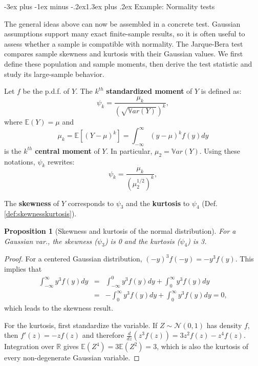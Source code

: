 \documentclass[
  11pt,
]{book}
\makeatletter
\renewcommand\section{\@startsection{section}{1}{\z@}
  {-3ex plus -1ex minus -.2ex}{1.3ex plus .2ex}
  {\normalfont\Large\bfseries\color{TextbookInk}}}
\newtheorem{proposition}{Proposition}[chapter]
\theoremstyle{definition}
\theoremstyle{definition}
\theoremstyle{definition}
\theoremstyle{definition}
\theoremstyle{remark}
\makeatother
\begin{document}
\section{Example: Normality tests}\label{example-normality-tests}

The general ideas above can now be assembled in a concrete test. Gaussian assumptions support many exact finite-sample results, so it is often useful to assess whether a sample is compatible with normality. The Jarque-Bera test compares sample skewness and kurtosis with their Gaussian values. We first define these population and sample moments, then derive the test statistic and study its large-sample behavior.

Let \(f\) be the p.d.f. of \(Y\). The \(k^{th}\) \textbf{standardized moment} of \(Y\) is defined as:
\[
\psi_k = \frac{\mu_k}{\left(\sqrt{\mathbb{V}ar(Y)}\right)^k},
\]
where \(\mathbb{E}(Y)=\mu\) and
\[
\mu_k = \mathbb{E}[(Y-\mu)^k]= \int_{-\infty}^{\infty} (y-\mu)^k f(y) dy
\]
is the \(k^{th}\) \textbf{central moment} of \(Y\). In particular, \(\mu_2 = \mathbb{V}ar(Y)\). Using these notations, \(\psi_k\) rewrites:
\[
\psi_k = \frac{\mu_k}{\left(\mu_2^{1/2}\right)^k},
\]

The \textbf{skewness} of \(Y\) corresponds to \(\psi_3\) and the \textbf{kurtosis} to \(\psi_4\) (Def. \ref{def:skewnesskurtosis}).

\begin{proposition}[Skewness and kurtosis of the normal distribution]
\protect\hypertarget{prp:normSkewKurt}{}\label{prp:normSkewKurt}For a Gaussian var., the skewness (\(\psi_3\)) is 0 and the kurtosis (\(\psi_4\)) is 3.
\end{proposition}

\begin{proof}
For a centered Gaussian distribution, \((-y)^3f(-y)=-y^3f(y)\). This implies that
\begin{eqnarray*}
\int_{-\infty}^{\infty}y^3f(y)dy&=&\int_{-\infty}^{0}y^3f(y)dy+\int_{0}^{\infty}y^3f(y)dy\\
&=&-\int_{0}^{\infty}y^3f(y)dy+\int_{0}^{\infty}y^3f(y)dy=0,
\end{eqnarray*}
which leads to the skewness result.

For the kurtosis, first standardize the variable. If \(Z\sim\mathcal{N}(0,1)\) has density \(f\), then \(f'(z)=-zf(z)\) and therefore \(\frac{d}{dz}(z^3f(z))=3z^2f(z)-z^4f(z)\). Integration over \(\mathbb{R}\) gives \(\mathbb{E}(Z^4)=3\mathbb{E}(Z^2)=3\), which is also the kurtosis of every non-degenerate Gaussian variable.
\end{proof}
\end{document}
